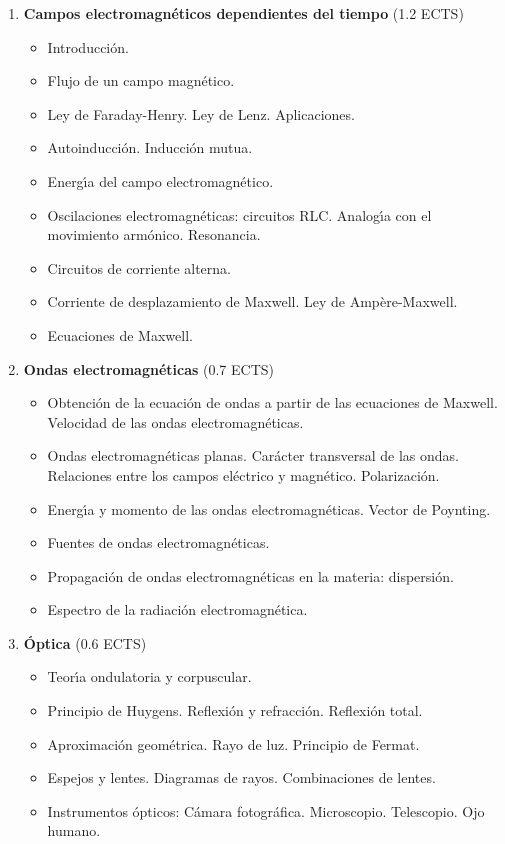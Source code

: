 \begin{enumerate}[{\bf 1. }]
\item {\bf Campos electromagn\'{e}ticos dependientes del tiempo} \hfill (1.2 ECTS) 
\begin{itemize} \addtolength{\itemsep}{-0.25\baselineskip}
\noindent
\item Introducci\'{o}n.
\item  Flujo de un campo magn\'{e}tico.
\item  Ley de Faraday-Henry. Ley de Lenz. Aplicaciones.
\item  Autoinducci\'{o}n. Inducci\'{o}n mutua.
\item Energ\'{\i}a del campo electromagn\'{e}tico.
\item Oscilaciones electromagn\'{e}ticas: circuitos RLC. Analog\'{\i}a con el movimiento arm\'{o}nico. Resonancia.
\item Circuitos de corriente alterna.
\item Corriente de desplazamiento de Maxwell. Ley de Amp\`{e}re-Maxwell.
\item  Ecuaciones de Maxwell.
\end{itemize}


\item {\bf Ondas electromagn\'{e}ticas} \hfill (0.7 ECTS) 
\begin{itemize} \addtolength{\itemsep}{-0.25\baselineskip}
\noindent
\item  Obtenci\'{o}n de la ecuaci\'{o}n de ondas a partir de las ecuaciones
 de Maxwell. Velocidad de las ondas electromagn\'{e}ticas.
\item  Ondas electromagn\'{e}ticas planas. Car\'{a}cter transversal de las ondas.
 Relaciones entre los campos el\'{e}ctrico y magn\'{e}tico. Polarizaci\'{o}n.
\item  Energ\'{\i}a y momento de las ondas electromagn\'{e}ticas. Vector de Poynting.
\item  Fuentes de ondas electromagn\'{e}ticas.
\item  Propagaci\'{o}n de ondas electromagn\'{e}ticas en la materia: dispersi\'{o}n.
\item  Espectro de la radiaci\'{o}n electromagn\'{e}tica. 
\end{itemize}



\item {\bf \'{O}ptica} \hfill (0.6 ECTS)
\begin{itemize} \addtolength{\itemsep}{-0.25\baselineskip}
\noindent
\item  Teor\'{\i}a ondulatoria y corpuscular.
\item  Principio de Huygens. Reflexi\'{o}n y refracci\'{o}n. Reflexi\'{o}n total.
\item  Aproximaci\'{o}n geom\'{e}trica. Rayo de luz. Principio de Fermat.
\item  Espejos y lentes. Diagramas de rayos. Combinaciones de lentes.
\item  Instrumentos \'{o}pticos: C\'{a}mara fotogr\'{a}fica. Microscopio. Telescopio. Ojo humano.
\end{itemize}


\end{enumerate}
